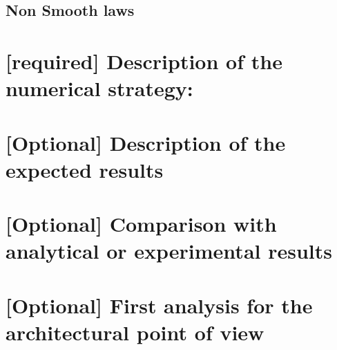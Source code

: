 \documentclass[10pt]{article}
\begin{document}
\subsection{Non Smooth laws}


\section{[required] Description of the numerical strategy: }


\section{[Optional] Description of the expected results}


\section{[Optional] Comparison with analytical or experimental results}


\section{[Optional] First analysis for the architectural point of view}
\end{document}

